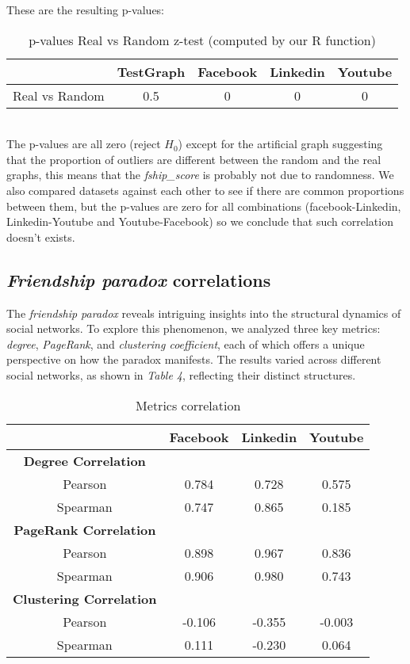 \documentclass{article}
\begin{document}
These are the resulting p-values: \\
\begin{table}[ht]
\centering
\begin{tabular}{|c|c|c|c|c|}
\hline
& TestGraph & Facebook & Linkedin & Youtube \\ \hline
Real vs Random & 0.5 & 0 & 0 & 0\\ \hline
\end{tabular}
\caption{p-values Real vs Random z-test (computed by our R function)}
\end{table} 
\\
The p-values are all zero (reject \(H_0\)) except for the artificial graph suggesting that the proportion of outliers are different between the random and the real graphs, this means that the \textit{fship\_score} is probably not due to randomness. We also compared datasets against each other to see if there are common proportions between them, but the p-values are zero for all combinations (facebook-Linkedin, Linkedin-Youtube and Youtube-Facebook) so we conclude that such correlation doesn't exists.

\subsection{\textit{Friendship paradox} correlations}

The \textit{friendship paradox} reveals intriguing insights into the structural dynamics of social networks. To explore this phenomenon, we analyzed three key metrics: \textit{degree}, \textit{PageRank}, and \textit{clustering coefficient}, each of which offers a unique perspective on how the paradox manifests. 
The results varied across different social networks, as shown in \textit{Table 4}, reflecting their distinct structures. \\

\begin{table}[ht]
    \centering
    \begin{tabular}{|c|c|c|c|}
        \hline
        & Facebook & Linkedin & Youtube \\ \hline
        \textbf{Degree Correlation} & & & \\  \hline
        Pearson & 0.784 & 0.728 & 0.575 \\ \hline
        Spearman  & 0.747 & 0.865 & 0.185 \\ \hline

        \textbf{PageRank Correlation} & & &\\ \hline
        Pearson & 0.898 & 0.967 & 0.836 \\ \hline
        Spearman  & 0.906 & 0.980 & 0.743 \\ \hline

        \textbf{Clustering Correlation} & & &\\ \hline
        Pearson & -0.106 & -0.355 & -0.003 \\ \hline
        Spearman  & 0.111 & -0.230 & 0.064 \\ \hline
    \end{tabular}
    \caption{Metrics correlation}
\end{table} 
\end{document}
